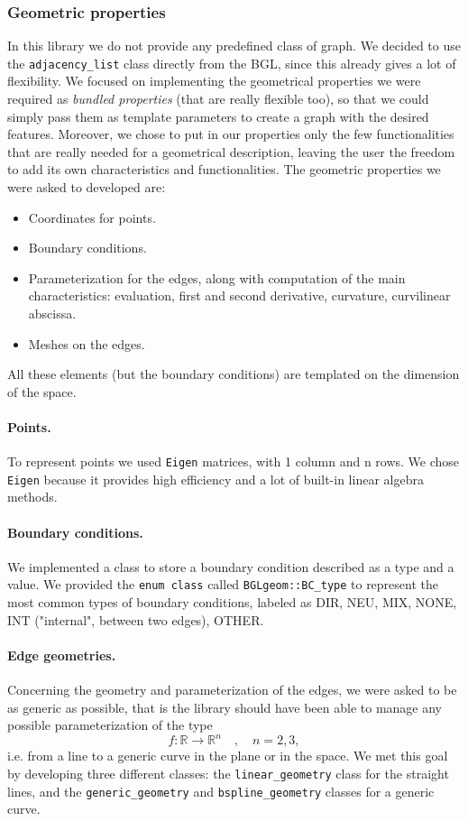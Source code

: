 \documentclass[10pt]{article} %
\newcommand{\classname}[1]{\texttt{#1}}
\begin{document}
	\subsubsection{Geometric properties}
	In this library we do not provide any predefined class of graph. We decided to use the \classname{adjacency\_list} class directly from the BGL, since this already gives a lot of flexibility. We focused on implementing the geometrical properties we were required as \textit{bundled properties} (that are really flexible too), so that we could simply pass them as template parameters to create a graph with the desired features. Moreover, we chose to put in our properties only the few functionalities that are really needed for a geometrical description, leaving the user the freedom to add its own characteristics and functionalities. \newline
	The geometric properties we were asked to developed are:
	\begin{itemize}
		\item Coordinates for points.
		\item Boundary conditions.
		\item Parameterization for the edges, along with computation of the main characteristics: evaluation, first and second derivative, curvature, curvilinear abscissa.
		\item Meshes on the edges.
	\end{itemize}
	All these elements (but the boundary conditions) are templated on the dimension of the space.				
	\paragraph{Points.}	To represent points we used \texttt{Eigen} matrices, with 1 column and n rows. We chose \texttt{Eigen} because it provides high efficiency and a lot of built-in linear algebra methods.
	\paragraph{Boundary conditions.} We implemented a class to store a boundary condition described as a type and a value. We provided the \texttt{enum class} called \texttt{BGLgeom::BC\_type} to represent the most common types of boundary conditions, labeled as DIR, NEU, MIX, NONE, INT ("internal", between two edges), OTHER.
	\paragraph{Edge geometries.} Concerning the geometry and parameterization of the edges, we were asked to be as generic as possible, that is the library should have been able to manage any possible parameterization of the type
	\begin{equation*}
		f:\mathbb{R}\rightarrow\mathbb{R}^{n} \quad, \quad n=2,3 ,
	\end{equation*}
	i.e. from a line to a generic curve in the plane or in the space. We met this goal by developing three different classes: the \classname{linear\_geometry} class for the straight lines, and the \classname{generic\_geometry} and \classname{bspline\_geometry} classes for a generic curve.
\end{document}

